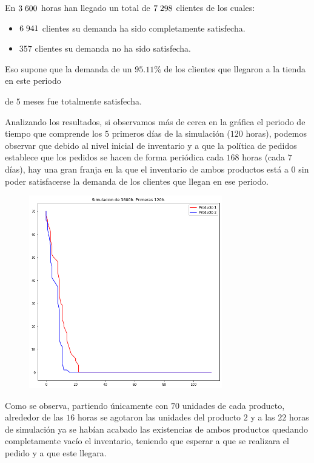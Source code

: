 \documentclass[a4paper,12pt]{article}
\begin{document}
	
	En $3\hspace{1mm}600$ horas han llegado un total de $7\hspace{1mm}298$ clientes de los cuales:
	
	\begin{itemize}
		\item $6\hspace{1mm}941$ clientes su demanda ha sido completamente satisfecha.
		\item $357$ clientes su demanda no ha sido satisfecha.
	\end{itemize}

	Eso supone que la demanda de un $95.11\%$ de los clientes que llegaron a la tienda en este periodo

	de $5$ meses fue totalmente satisfecha.
	
	Analizando los resultados, si observamos más de cerca en la gráfica el periodo de tiempo que
comprende los $5$ primeros días de la simulación ($120$ horas), podemos observar que debido al
nivel inicial de inventario y a que la política de pedidos establece que los pedidos se hacen de
forma periódica cada $168$ horas (cada $7$ días), hay una gran franja en la que el inventario de ambos
productos está a $0$ sin poder satisfacerse la demanda de los clientes que llegan en ese periodo.
	
	\begin{figure}[H]
		\centering
		\includegraphics[width=0.75\textwidth]{include/simulacion_5d.png}
	\end{figure}
	
	Como se observa, partiendo únicamente con $70$ unidades de cada producto, alrededor de las $16$
	horas se agotaron las unidades del producto $2$ y a las $22$ horas de simulación ya se habían acabado
las existencias de ambos productos quedando completamente vacío el inventario, teniendo que	esperar a que se realizara el pedido y a que este llegara.
	
\end{document}

